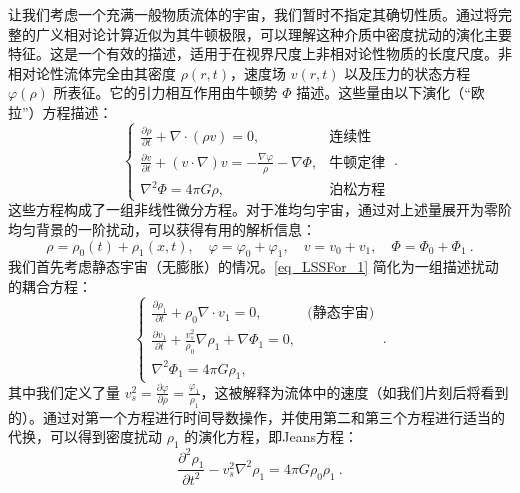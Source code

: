 让我们考虑一个充满一般物质流体的宇宙，我们暂时不指定其确切性质。通过将完整的广义相对论计算近似为其牛顿极限，可以理解这种介质中密度扰动的演化主要特征。这是一个有效的描述，适用于在视界尺度上非相对论性物质的长度尺度。非相对论性流体完全由其密度 \( \rho(r, t) \)，速度场 \( v(r, t) \) 以及压力的状态方程 \( \varphi(\rho) \) 所表征。它的引力相互作用由牛顿势 \( \Phi \) 描述。这些量由以下演化（“欧拉”）方程描述：
\begin{equation}\label{eq_LSSFor_1} \begin{cases} 
\frac{\partial \rho}{\partial t} + \nabla \cdot (\rho v) = 0, & \text{连续性} \\
\frac{\partial v}{\partial t} + (v \cdot \nabla)v = -\frac{\nabla \varphi}{\rho} - \nabla \Phi, & \text{牛顿定律} \\
\nabla^2 \Phi = 4\pi G \rho, & \text{泊松方程}
\end{cases} ~.
\end{equation} 
这些方程构成了一组非线性微分方程。对于准均匀宇宙，通过对上述量展开为零阶均匀背景的一阶扰动，可以获得有用的解析信息：
\begin{equation} 
\rho = \rho_0(t) + \rho_1(x, t), \quad \varphi = \varphi_0 + \varphi_1, \quad v = v_0 + v_1, \quad \Phi = \Phi_0 + \Phi_1~. 
\end{equation}
我们首先考虑静态宇宙（无膨胀）的情况。\autoref{eq_LSSFor_1} 简化为一组描述扰动的耦合方程：
\begin{equation}
\begin{cases} 
\frac{\partial \rho_1}{\partial t} + \rho_0 \nabla \cdot v_1 = 0, & \text{(静态宇宙)} \\
\frac{\partial v_1}{\partial t} + \frac{v^2_s}{\rho_0} \nabla \rho_1 + \nabla \Phi_1 = 0, \\
\nabla^2 \Phi_1 = 4\pi G \rho_1,
\end{cases} ~.
\end{equation}
其中我们定义了量 \( v^2_s = \frac{\partial \varphi}{\partial \rho} = \frac{\varphi_1}{\rho_1} \)，这被解释为流体中的速度（如我们片刻后将看到的）。通过对第一个方程进行时间导数操作，并使用第二和第三个方程进行适当的代换，可以得到密度扰动 \( \rho_1 \) 的演化方程，即Jeans方程：
\begin{equation}\label{eq_LSSFor_2}
\frac{\partial^2 \rho_1}{\partial t^2} - v^2_s \nabla^2 \rho_1 = 4\pi G \rho_0 \rho_1~.
\end{equation}
